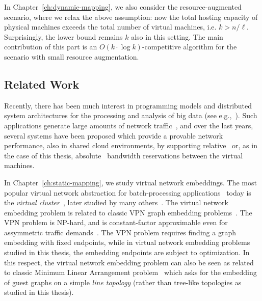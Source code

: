 In Chapter~\ref{ch:dynamic-mapping}, we also consider the resource-augmented scenario, where we relax the above assumption: now the total hosting capacity of physical machines exceeds the total number of virtual machines, i.e. $k > n/\ell$.
Surprisingly, the lower bound remains $k$ also in this setting.
The main contribution of this part is an $O(k\cdot \log k)$-competitive algorithm for the scenario with small resource augmentation.



\subsection{Related Work}


Recently, there has been much interest in programming models and distributed
system architectures for the processing and analysis of big data (see e.g.,~\cite{nodb,mapreduce,shark}).
Such applications
generate large amounts of network traffic~\cite{orchestra,talk-about,amazonbw},
and over the last years, several systems have been proposed which provide
a provable network performance, also in shared cloud environments, by supporting
relative~\cite{faircloud,elasticswitch,seawall}
or, as in the case of this thesis, absolute~\cite{oktopus,secondnet,drl,gatekeeper,proteus} bandwidth reservations
between the virtual machines.

\medskip

In Chapter~\ref{ch:static-mapping}, we study virtual network embeddings.
The most popular virtual network abstraction for batch-processing applications~\cite{mapreduce} today is the \emph{virtual cluster}~\cite{oktopus}, later studied by many others~\cite{talk-about,infocom16,ccr15emb,proteus}.
The virtual network embedding problem is related to classic VPN graph embedding problems~\cite{Goyal2008,gupta2001provisioning}.
The VPN problem is NP-hard, and is constant-factor approximable even for assymmetric traffic demands~\cite{vpn-apx}.
The VPN problem requires finding a graph embedding with fixed endpoints, while in virtual network embedding problems studied in this thesis, the embedding endpoints are subject to optimization.
In this respect, the virtual network embedding problem can also be seen as related to
classic Minimum Linear Arrangement problem~\cite{ord-prob,ord-prob2} which asks for the
embedding of guest graphs on a simple \emph{line topology} (rather than tree-like topologies as
studied in this thesis).

